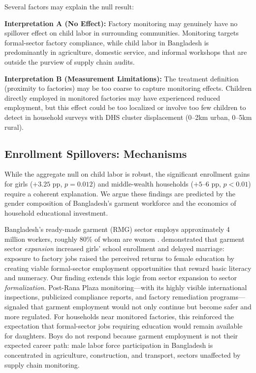 \documentclass[12pt]{article}
\begin{document}
Several factors may explain the null result:

\textbf{Interpretation A (No Effect):} Factory monitoring may genuinely have no spillover effect on child labor in surrounding communities. Monitoring targets formal-sector factory compliance, while child labor in Bangladesh is predominantly in agriculture, domestic service, and informal workshops that are outside the purview of supply chain audits.

\textbf{Interpretation B (Measurement Limitations):} The treatment definition (proximity to factories) may be too coarse to capture monitoring effects. Children directly employed in monitored factories may have experienced reduced employment, but this effect could be too localized or involve too few children to detect in household surveys with DHS cluster displacement (0--2km urban, 0--5km rural).

\subsection{Enrollment Spillovers: Mechanisms}

While the aggregate null on child labor is robust, the significant enrollment gains for girls ($+3.25$ pp, $p = 0.012$) and middle-wealth households ($+5$--$6$ pp, $p < 0.01$) require a coherent explanation. We argue these findings are predicted by the gender composition of Bangladesh's garment workforce and the economics of household educational investment.

Bangladesh's ready-made garment (RMG) sector employs approximately 4 million workers, roughly 80\% of whom are women \citep{HeathMobarak2015}. \citet{HeathMobarak2015} demonstrated that garment sector \textit{expansion} increased girls' school enrollment and delayed marriage: exposure to factory jobs raised the perceived returns to female education by creating viable formal-sector employment opportunities that reward basic literacy and numeracy. Our finding extends this logic from sector expansion to sector \textit{formalization}. Post-Rana Plaza monitoring---with its highly visible international inspections, publicized compliance reports, and factory remediation programs---signaled that garment employment would not only continue but become safer and more regulated. For households near monitored factories, this reinforced the expectation that formal-sector jobs requiring education would remain available for daughters. Boys do not respond because garment employment is not their expected career path: male labor force participation in Bangladesh is concentrated in agriculture, construction, and transport, sectors unaffected by supply chain monitoring.
\end{document}
